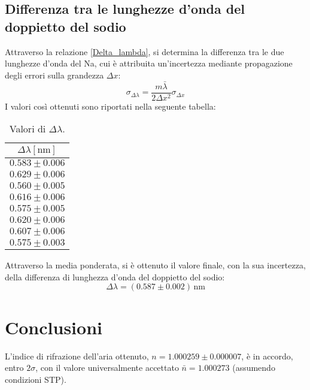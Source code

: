 \documentclass[]{article}
\let\oldsection\section%
\renewcommand{\section}{%
	\renewcommand{\theequation}{\thesection.\arabic{equation}}%
	\oldsection}%
\let\oldsubsection\subsection%
\renewcommand{\subsection}{%
	\renewcommand{\theequation}{\thesubsection.\arabic{equation}}%
	\oldsubsection}%
\begin{document}
\subsection{Differenza tra le lunghezze d'onda del doppietto del sodio}
Attraverso la relazione \ref{Delta_lambda}, si determina la differenza tra le due lunghezze d'onda del Na, cui è attribuita un'incertezza mediante propagazione degli errori sulla grandezza $\Delta x$:
\begin{equation}
    \label{sigma-delta-lambda}
    \sigma_{\Delta \lambda} = \frac{m \bar{\lambda}}{2 \Delta x ^2} \sigma_{\Delta x}
\end{equation}
I valori così ottenuti sono riportati nella seguente tabella:
\begin{table}[H]
    \centering
    \begin{tabular}{||c||}
        \hline
        $\Delta \lambda [\text{nm}]$ \\
        \hline\hline

        $0.583 \pm 0.006$ \\\hline
        $0.629 \pm 0.006$ \\\hline
        $0.560 \pm 0.005$ \\\hline
        $0.616 \pm 0.006$ \\\hline
        $0.575 \pm 0.005$ \\\hline
        $0.620 \pm 0.006$ \\\hline
        $0.607 \pm 0.006$ \\\hline
        $0.575 \pm 0.003$ \\\hline
    
    \end{tabular}
    \caption{Valori di $\Delta \lambda$.}
    \label{tab:delta-lambda}
\end{table}
Attraverso la media ponderata, si è ottenuto il valore finale, con la sua incertezza, della differenza di lunghezza d'onda del doppietto del sodio:
\begin{equation}
    \label{delta-lambda-value}
    \Delta \lambda = (0.587 \pm 0.002) \, \text{nm}
\end{equation}

\section{Conclusioni}
L'indice di rifrazione dell'aria ottenuto, $n=1.000259 \pm 0.000007$, è in accordo, entro $2 \sigma$, con il valore universalmente accettato $\bar{n}=1.000273$ (assumendo condizioni STP).
\end{document}
